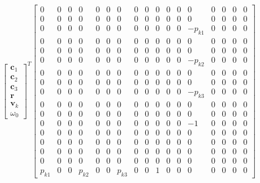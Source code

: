 \documentclass{article}
\begin{document}
\begin{align}
    \begin{bmatrix}
        \mathbf{c}_1 \\
        \mathbf{c}_2 \\
        \mathbf{c}_3 \\
        \mathbf{r} \\
        \mathbf{v}_k \\
        \omega_0
    \end{bmatrix}^T 
    \begin{bmatrix}
        0 & 0 & 0 & 0 & 0 & 0 & 0 & 0 & 0 & 0 & 0 & 0 & 0 & 0 & 0 & 0 & 0 \\
        0 & 0 & 0 & 0 & 0 & 0 & 0 & 0 & 0 & 0 & 0 & 0 & 0 & 0 & 0 & 0 & 0 \\
        0 & 0 & 0 & 0 & 0 & 0 & 0 & 0 & 0 & 0 & 0 & 0 & -p_{k1} & 0 & 0 & 0 & 0 \\
        0 & 0 & 0 & 0 & 0 & 0 & 0 & 0 & 0 & 0 & 0 & 0 & 0 & 0 & 0 & 0 & 0 \\
        0 & 0 & 0 & 0 & 0 & 0 & 0 & 0 & 0 & 0 & 0 & 0 & 0 & 0 & 0 & 0 & 0 \\
        0 & 0 & 0 & 0 & 0 & 0 & 0 & 0 & 0 & 0 & 0 & 0 & -p_{k2} & 0 & 0 & 0 & 0 \\
        0 & 0 & 0 & 0 & 0 & 0 & 0 & 0 & 0 & 0 & 0 & 0 & 0 & 0 & 0 & 0 & 0 \\
        0 & 0 & 0 & 0 & 0 & 0 & 0 & 0 & 0 & 0 & 0 & 0 & 0 & 0 & 0 & 0 & 0 \\
        0 & 0 & 0 & 0 & 0 & 0 & 0 & 0 & 0 & 0 & 0 & 0 & -p_{k3} & 0 & 0 & 0 & 0 \\
        0 & 0 & 0 & 0 & 0 & 0 & 0 & 0 & 0 & 0 & 0 & 0 & 0 & 0 & 0 & 0 & 0 \\
        0 & 0 & 0 & 0 & 0 & 0 & 0 & 0 & 0 & 0 & 0 & 0 & 0 & 0 & 0 & 0 & 0 \\
        0 & 0 & 0 & 0 & 0 & 0 & 0 & 0 & 0 & 0 & 0 & 0 & -1 & 0 & 0 & 0 & 0 \\
        0 & 0 & 0 & 0 & 0 & 0 & 0 & 0 & 0 & 0 & 0 & 0 & 0 & 0 & 0 & 0 & 0 \\
        0 & 0 & 0 & 0 & 0 & 0 & 0 & 0 & 0 & 0 & 0 & 0 & 0 & 0 & 0 & 0 & 0 \\
        0 & 0 & 0 & 0 & 0 & 0 & 0 & 0 & 0 & 0 & 0 & 0 & 0 & 0 & 0 & 0 & 0 \\
        0 & 0 & 0 & 0 & 0 & 0 & 0 & 0 & 0 & 0 & 0 & 0 & 0 & 0 & 0 & 0 & 0 \\
        p_{k1} & 0 & 0 & p_{k2} & 0 & 0 & p_{k3} & 0 & 0 & 1 & 0 & 0 & 0 & 0 & 0 & 0 & 0
    \end{bmatrix}

\end{align}
\end{document}
